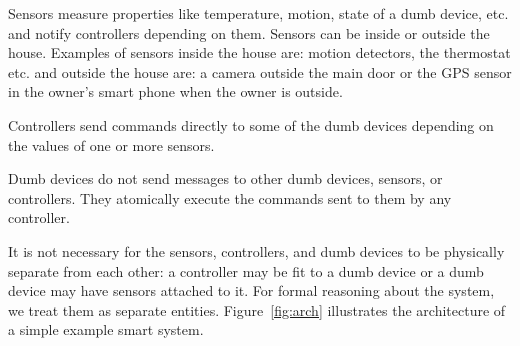 \documentclass{article}
\begin{document}
Sensors measure properties like temperature, motion, state of a dumb device, etc. and notify controllers depending on them. Sensors can be inside or outside the house. Examples of sensors inside the house are: motion detectors, the thermostat etc. and outside the house are: a camera outside the main door or the GPS sensor in the owner's smart phone when the owner is outside. 

Controllers send commands directly to some of the dumb devices depending on the values of one or more sensors. 

Dumb devices do not send messages to other dumb devices, sensors, or controllers. They atomically execute the commands sent to them by any controller. 

It is not necessary for the sensors, controllers, and dumb devices to be physically separate from each other: 
a controller may be fit to a dumb device or a dumb device may have sensors attached to it. For formal reasoning about the system, we treat them as separate entities. Figure~\ref{fig:arch} illustrates the architecture of a simple example smart system. 

\end{document}
